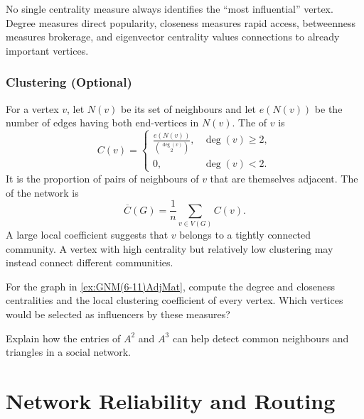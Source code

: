 \begin{Remark*}
No single centrality measure always identifies the ``most influential'' vertex. Degree measures direct popularity, closeness measures rapid access, betweenness measures brokerage, and eigenvector centrality values connections to already important vertices.
\end{Remark*}

\subsubsection{Clustering (Optional)}

For a vertex $v$, let $N(v)$ be its set of neighbours and let $e(N(v))$ be the number of edges having both end-vertices in $N(v)$. The  of $v$ is
\begin{equation*}
    C(v)=
    \begin{cases}
    \displaystyle\frac{e(N(v))}{\binom{\deg(v)}{2}},&\deg(v)\ge 2,\\[0.8em]
    0,&\deg(v)<2.
    \end{cases}
\end{equation*}
It is the proportion of pairs of neighbours of $v$ that are themselves adjacent. The  of the network is
\begin{equation*}
    \overline C(G)=\frac{1}{n}\sum_{v\in V(G)}C(v).
\end{equation*}
A large local coefficient suggests that $v$ belongs to a tightly connected community. A vertex with high centrality but relatively low clustering may instead connect different communities.

\begin{Exercise}
For the graph in \cref{ex:GNM(6-11)AdjMat}, compute the degree and closeness centralities and the local clustering coefficient of every vertex. Which vertices would be selected as influencers by these measures?
\end{Exercise}

\begin{Exercise}
Explain how the entries of $A^2$ and $A^3$ can help detect common neighbours and triangles in a social network.
\end{Exercise}

\section{Network Reliability and Routing}\label{sec:ReliabilityRouting}

